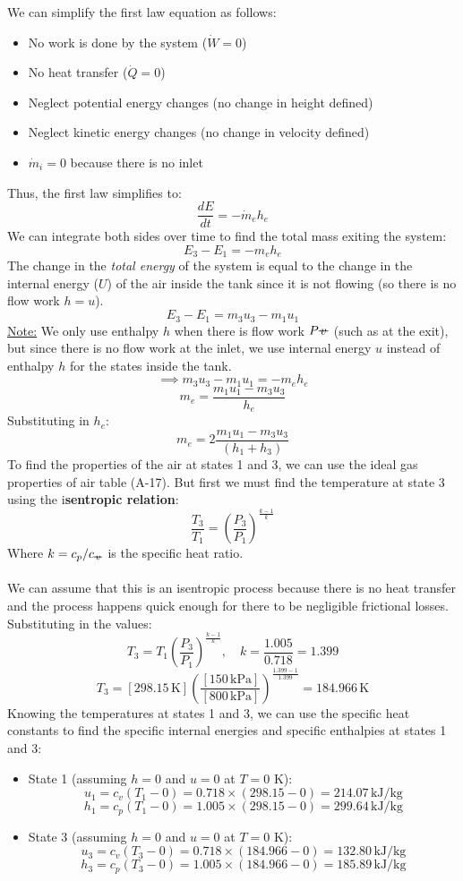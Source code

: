 \documentclass[12pt]{article}
\newcommand{\svol}{%
  \mathord{\text{\ooalign{%
    \hfil$v$\hfil\cr
    \hfil\rule[0.6ex]{0.8em}{0.5pt}\hfil
  }}}%
}
\begin{document}
We can simplify the first law equation as follows:
\begin{itemize}
\item No work is done by the system ($\dot{W}=0$)
\item No heat transfer ($\dot{Q}=0$)
\item Neglect potential energy changes (no change in height defined)
\item Neglect kinetic energy changes (no change in velocity defined)
\item $\dot{m}_i = 0$ because there is no inlet
\end{itemize}
Thus, the first law simplifies to:
\[\frac{dE}{dt} = -\dot{m}_e h_e\]
We can integrate both sides over time to find the total mass exiting the system:
\[E_3 - E_1 = -m_e h_e\]
The change in the \textit{total energy} of the system is equal to the change in the internal energy ($U$) of the air inside the tank since it is not flowing (so there is no flow work $h = u$).
\[E_3 - E_1 = m_3 u_3 - m_1 u_1\]
\underline{Note:} We only use enthalpy $h$ when there is flow work $P\svol$ (such as at the exit), but since there is no flow work at the inlet, we use internal energy $u$ instead of enthalpy $h$ for the states inside the tank.
\[\implies m_3 u_3 - m_1 u_1 = -m_e h_e\]
\[m_e = \frac{m_1 u_1 - m_3 u_3}{h_e}\]
Substituting in $h_e$:
\[m_e = 2\frac{m_1 u_1 - m_3 u_3}{(h_1 + h_3)}\]
To find the properties of the air at states 1 and 3, we can use the ideal gas properties of air table (A-17). But first we must find the temperature at state 3 using the i\textbf{sentropic relation}:
\[\boxed{\frac{T_3}{T_1} = \left(\frac{P_3}{P_1}\right)^{\frac{k-1}{k}}}\]
Where $k = c_p/c_{\svol}$ is the specific heat ratio.\\\\
We can assume that this is an isentropic process because there is no heat transfer and the process happens quick enough for there to be negligible frictional losses. Substituting in the values:
\[T_3 = T_1 \left(\frac{P_3}{P_1}\right)^{\frac{k-1}{k}} , \quad k = \frac{1.005}{0.718} = 1.399\]
\[T_3 = [298.15\,\text{K}] \left(\frac{[150\,\text{kPa}]}{[800\,\text{kPa}]}\right)^{\frac{1.399-1}{1.399}}=184.966\,\text{K}\]
Knowing the temperatures at states 1 and 3, we can use the specific heat constants to find the specific internal energies and specific enthalpies at states 1 and 3: 
\begin{itemize}
    \item State 1 (assuming $h=0$ and $u=0$ at $T=0$ K):
    \[u_1 = c_v (T_1 - 0) = 0.718 \times (298.15 - 0) = 214.07\,\text{kJ/kg}\]
    \[h_1 = c_p (T_1 - 0) = 1.005 \times (298.15 - 0) = 299.64\,\text{kJ/kg}\]
    \item State 3 (assuming $h=0$ and $u=0$ at $T=0$ K):
    \[u_3 = c_v (T_3 - 0) = 0.718 \times (184.966 - 0) = 132.80\,\text{kJ/kg}\]
    \[h_3 = c_p (T_3 - 0) = 1.005 \times (184.966 - 0) = 185.89\,\text{kJ/kg}\]
\end{itemize}
\end{document}
